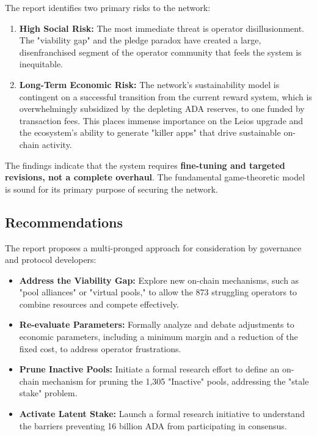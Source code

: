 \documentclass[11pt, letterpaper]{article}
\begin{document}
The report identifies two primary risks to the network:

\begin{enumerate}
    \item \textbf{High Social Risk:} The most immediate threat is operator disillusionment. The "viability gap" 
    and the pledge paradox have created a large, disenfranchised segment of the operator community that feels the 
    system is inequitable.
    
    \item \textbf{Long-Term Economic Risk:} The network's sustainability model is contingent on a successful 
    transition from the current reward system, which is overwhelmingly subsidized by the depleting ADA reserves,
    to one funded by transaction fees. This places immense importance on the Leios upgrade and the ecosystem's 
    ability to generate "killer apps" that drive sustainable on-chain activity.
\end{enumerate}

The findings indicate that the system requires \textbf{fine-tuning and targeted revisions, not a complete overhaul}. The fundamental game-theoretic model is sound for its primary purpose of securing the network.

\subsection*{Recommendations}

The report proposes a multi-pronged approach for consideration by governance and protocol developers:

\begin{itemize}
    \item \textbf{Address the Viability Gap:} Explore new on-chain mechanisms, such as "pool alliances" or "virtual pools," to allow the 873 struggling operators to combine resources and compete effectively.
    
    \item \textbf{Re-evaluate Parameters:} Formally analyze and debate adjustments to economic parameters, including a minimum margin and a reduction of the fixed cost, to address operator frustrations.
    
    \item \textbf{Prune Inactive Pools:} Initiate a formal research effort to define an on-chain mechanism for pruning the 1,305 "Inactive" pools, addressing the "stale stake" problem.
    
    \item \textbf{Activate Latent Stake:} Launch a formal research initiative to understand the barriers preventing 16 billion ADA from participating in consensus.
\end{itemize}
\end{document}

